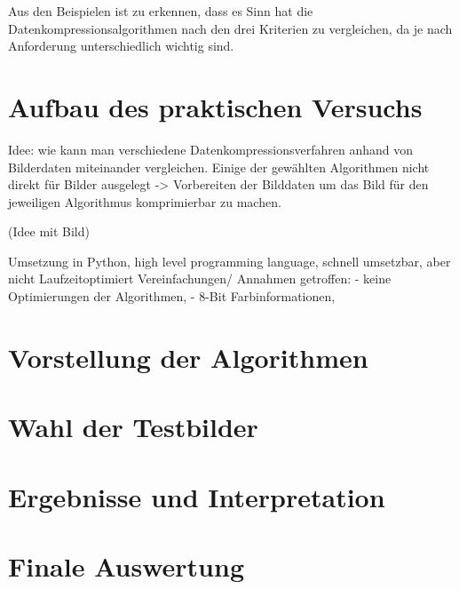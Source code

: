 \documentclass[conference]{IEEEtran}
\begin{document}
Aus den Beispielen ist zu erkennen, dass es Sinn hat die 
Datenkompressionsalgorithmen nach den drei Kriterien zu vergleichen, 
da je nach Anforderung unterschiedlich wichtig sind.


\section{Aufbau des praktischen Versuchs}

Idee: wie kann man verschiedene Datenkompressionsverfahren anhand von Bilderdaten
miteinander vergleichen.
Einige der gewählten Algorithmen nicht direkt für Bilder ausgelegt -> 
Vorbereiten der Bilddaten um das Bild für den jeweiligen Algorithmus 
komprimierbar zu machen.

(Idee mit Bild)

Umsetzung in Python, high level programming language, schnell umsetzbar, aber nicht 
Laufzeitoptimiert
Vereinfachungen/ Annahmen getroffen:
- keine Optimierungen der Algorithmen, 
- 8-Bit Farbinformationen, 




\section{Vorstellung der Algorithmen}


\section{Wahl der Testbilder}


\section{Ergebnisse und Interpretation}


\section{Finale Auswertung}




\end{document}
